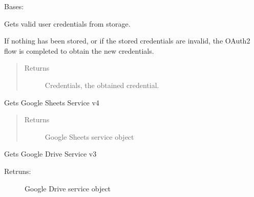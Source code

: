 \documentclass[letterpaper,10pt,english,openany]{sphinxmanual}
\begin{document}
\begin{fulllineitems}
\label{index:rpicameramon.telemetry.GoogleHandler}
Bases: 

\begin{fulllineitems}
\label{index:rpicameramon.telemetry.GoogleHandler.get_credentials}
Gets valid user credentials from storage.

If nothing has been stored, or if the stored credentials are invalid,
the OAuth2 flow is completed to obtain the new credentials.
\begin{quote}\begin{description}
\item[{Returns}] \leavevmode
Credentials, the obtained credential.

\end{description}\end{quote}

\end{fulllineitems}


\begin{fulllineitems}
\label{index:rpicameramon.telemetry.GoogleHandler.get_sheets_service}
Gets Google Sheets Service v4
\begin{quote}\begin{description}
\item[{Returns}] \leavevmode
Google Sheets service object

\end{description}\end{quote}

\end{fulllineitems}


\begin{fulllineitems}
\label{index:rpicameramon.telemetry.GoogleHandler.get_file_service}
Gets Google Drive Service v3
\begin{description}
\item[{Retruns:}] \leavevmode
Google Drive service object


\end{description}
\end{fulllineitems}
\end{fulllineitems}
\end{document}
